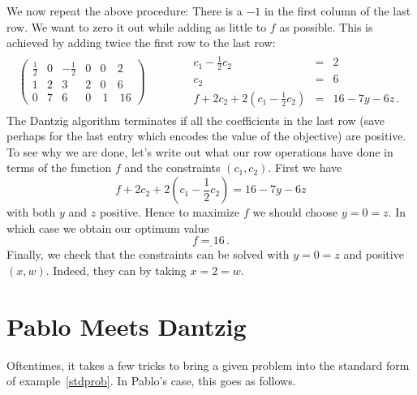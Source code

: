\begin{example}
We now repeat the above procedure: There is a $-1$ in the first column of the last row. We want to zero it out while adding as little to
$f$ as possible. This is achieved by adding twice the first row to the last row:
\[
\begin{array}{c|c}
\left(
\begin{array}{rrrrr|r}
\frac12&0&-\frac12&0&0&2\\[1mm]
1&2&3&2&0&6\\\hline
0&7&6&0&\ 1&\ 16
\end{array}\right)
\quad\quad  &\quad 
\begin{array}{rcl}
c_1-\frac12 c_2&=&2\\[1mm]
c_2&=&6\\
f+2c_2+2(c_1-\frac12 c_2)&=&16-7y-6z\, .
\end{array}
\end{array}
\]
The Dantzig algorithm terminates if all the coefficients in the last row (save perhaps for the last entry which encodes the value of the objective) are positive.
To see why we are done, let's write out what our row operations have done in terms of the function $f$ and the constraints $(c_1,c_2)$.
First we have
\[
f+2c_2+2(c_1-\frac12 c_2)=16-7y-6z
\]
with both $y$ and $z$ positive. Hence to maximize $f$ we should choose $y=0=z$. In which case we obtain our optimum value
\[
\underline{f=16\, .}
\]
Finally, we check that the constraints can be solved with $y=0=z$ and positive $(x,w)$. Indeed, they can by taking $x=2=w$.
\end{example} 

\section{Pablo Meets Dantzig} 
Oftentimes, it takes a few tricks to bring a given problem into the standard  form of example~\ref{stdprob}. In Pablo's case, this goes as follows.

